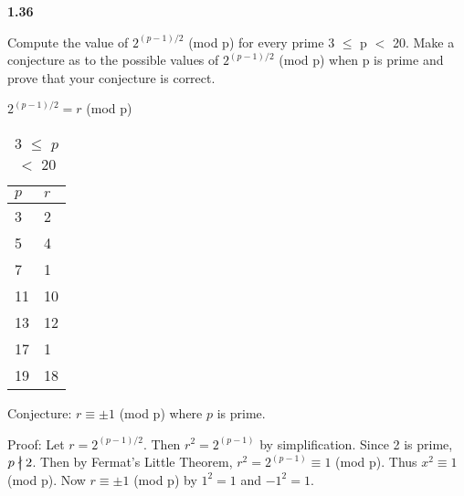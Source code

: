 \documentclass[12pt]{article}
\newcommand{\ndivides}{%
  \mathrel{\mkern.5mu %
    \ooalign{\hidewidth$\big|$\hidewidth\cr$\nmid$\cr}%
  }%
}
\begin{document}
 \begin{center}
    \Large\textbf{1.36}
 \end{center}

Compute the value of $2^{(p-1)/2}$ (mod p) for every prime 3 $\leq$ p $<$ 20. Make a conjecture as to the possible values of $2^{(p-1)/2}$ (mod p) when p is prime and prove that your conjecture is correct.

\begin{center}
  $2^{(p-1)/2} = r$ (mod p)
\end{center}

\begin{table}[h!]
  \begin{center}
    \caption{3 $\leq$ $p$ $<$ 20}
    \begin{tabular}{l|l}
      $p$ & $r$  \\
      \hline
      3 & 2 \\
      5 & 4 \\
      7 & 1 \\
      11 & 10 \\
      13 & 12 \\
      17 & 1 \\
      19 & 18 \\
    \end{tabular}
  \end{center}
\end{table}

Conjecture: $r \equiv \pm1$ (mod p) where $p$ is prime.

\bigskip

Proof: Let $r = 2^{(p-1)/2}$. Then $r^2 = 2^{(p-1)}$ by simplification. Since 2 is prime, $p \ndivides 2$. Then by Fermat's Little Theorem, $r^2 = 2^{(p-1)} \equiv 1$ (mod p). Thus $x^2 \equiv 1$ (mod p). Now $r \equiv \pm1$ (mod p) by $1^2 = 1$ and $-1^2 = 1$.
\end{document}

